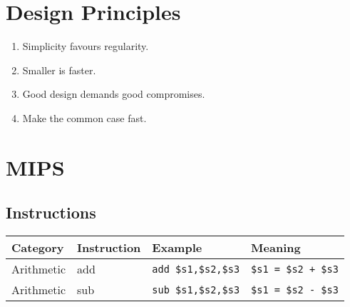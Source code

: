 \documentclass{article}
\theoremstyle{sltheorem}
\newcommand*\T[1]{\texttt{#1}}
\begin{document}
\section{Design Principles}
\begin{enumerate}
	\item Simplicity favours regularity.
	\item Smaller is faster.
	\item Good design demands good compromises.
	\item Make the common case fast.
\end{enumerate}
\section{MIPS}
\subsection{Instructions}
\begin{tabular}{| l | l | l | l |}
	\hline
	Category & Instruction & Example & Meaning	\\
	\hline
	\hline
	Arithmetic & add & \T{add \$s1,\$s2,\$s3} & \T{\$s1 = \$s2 + \$s3} \\
	\hline
	Arithmetic & sub & \T{sub \$s1,\$s2,\$s3} & \T{\$s1 = \$s2 - \$s3} \\
	\hline
\end{tabular}
\end{document}
